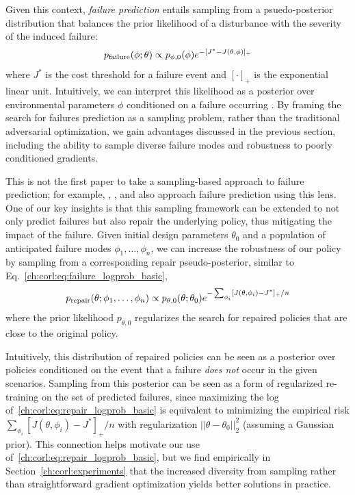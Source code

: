 Given this context, \textit{failure prediction} entails sampling from a psuedo-posterior distribution that balances the prior likelihood of a disturbance with the severity of the induced failure:
%
\begin{equation}
    p_{\rm{failure}}(\phi; \theta) \propto p_{\phi, 0}(\phi)e^{-[J^* - J(\theta, \phi)]_+} \label{ch:corl:eq:failure_logprob_basic}
\end{equation}
%
where $J^*$ is the cost threshold for a failure event and $[\cdot]_+$ is the exponential linear unit. Intuitively, we can interpret this likelihood as a posterior over environmental parameters $\phi$ conditioned on a failure occurring \cite{sinhaNeuralBridgeSampling2020,zhouRoCUSRobotController2021,maSamplingCanBe2019,dawsonBayesianApproachBreaking2023}. By framing the search for failures prediction as a sampling problem, rather than the traditional adversarial optimization, we gain advantages discussed in the previous section, including the ability to sample diverse failure modes and robustness to poorly conditioned gradients.

This is not the first paper to take a sampling-based approach to failure prediction; for example, \cite{okellyScalableEndtoEndAutonomous2018}, \cite{sinhaNeuralBridgeSampling2020}, and \cite{zhouRoCUSRobotController2021} also approach failure prediction using this lens. One of our key insights is that this sampling framework can be extended to not only predict failures but also repair the underlying policy, thus mitigating the impact of the failure.
%
Given initial design parameters $\theta_0$ and a population of anticipated failure modes $\phi_1, \ldots, \phi_n$, we can increase the robustness of our policy by sampling from a corresponding repair pseudo-posterior, similar to Eq.~\eqref{ch:corl:eq:failure_logprob_basic},
%
\begin{equation}
    p_{\rm{repair}}(\theta; \phi_1, \ldots, \phi_n) \propto p_{\theta, 0}(\theta; \theta_0)e^{-\sum_{\phi_i}[J(\theta, \phi_i) - J^*]_+ / n} \label{ch:corl:eq:repair_logprob_basic}
\end{equation}
%
where the prior likelihood $p_{\theta, 0}$ regularizes the search for repaired policies that are close to the original policy.

Intuitively, this distribution of repaired policies can be seen as a posterior over policies conditioned on the event that a failure \textit{does not} occur in the given scenarios. Sampling from this posterior can be seen as a form of regularized re-training on the set of predicted failures, since maximizing the log of~\eqref{ch:corl:eq:repair_logprob_basic} is equivalent to minimizing the empirical risk $\sum_{\phi_i}[J(\theta, \phi_i) - J^*]_+ / n$ with regularization $||\theta-\theta_0||_2^2$ (assuming a Gaussian prior). This connection helps motivate our use of~\eqref{ch:corl:eq:repair_logprob_basic}, but we find empirically in Section~\ref{ch:corl:experiments} that the increased diversity from sampling rather than straightforward gradient optimization yields better solutions in practice.

